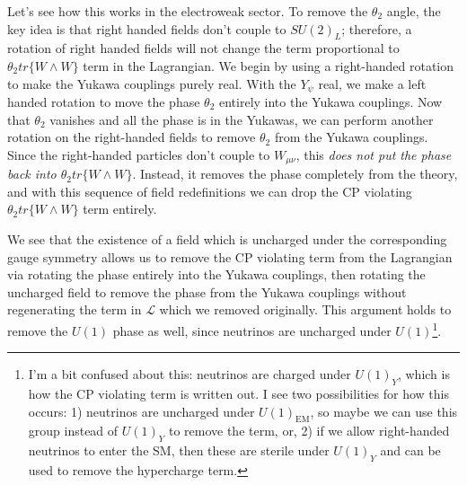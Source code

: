 \documentclass[11pt, oneside]{article}   	%
\theoremstyle{definition}
\begin{document}
Let's see how this works in the electroweak sector. To remove the $\theta_2$ angle, the key idea is that right handed fields don't couple to 
$SU(2)_L$; therefore, a rotation of right handed fields will not change the term proportional to $\theta_2 tr\{W\wedge W\}$ term in the Lagrangian. 
We begin by using a right-handed rotation to make the Yukawa couplings purely real. With the $Y_\psi$ real, we make a left handed rotation to 
move the phase $\theta_2$ entirely into the Yukawa couplings. Now that $\theta_2$ vanishes and all the phase is in the Yukawas, we can perform 
another rotation on the right-handed fields to remove $\theta_2$ from the Yukawa couplings. Since the right-handed particles don't couple to 
$W_{\mu\nu}$, this \textit{does not put the phase back into $\theta_2 tr\{W\wedge W\}$}. Instead, it removes the phase completely from the theory, 
and with this sequence of field redefinitions we can drop the CP violating $\theta_2 tr\{W\wedge W\}$ term entirely. 

We see that the existence of a field which is uncharged under the corresponding gauge symmetry allows us to remove the CP violating term 
from the Lagrangian via rotating the phase entirely into the Yukawa couplings, then rotating the uncharged field to remove the phase from 
the Yukawa couplings without regenerating the term in $\mathcal L$ which we removed originally. This argument holds to remove the $U(1)$ 
phase as well, since neutrinos are uncharged under $U(1)$\footnote{I'm a bit confused about this: neutrinos are charged under $U(1)_Y$, which 
is how the CP violating term is written out. I see two possibilities for how this occurs: 1) neutrinos are uncharged under $U(1)_\mathrm{EM}$, so maybe 
we can use this group instead of $U(1)_Y$ to remove the term, or, 2) if we allow right-handed neutrinos to enter the SM, then these are sterile 
under $U(1)_Y$ and can be used to remove the hypercharge term.}.
\end{document}
